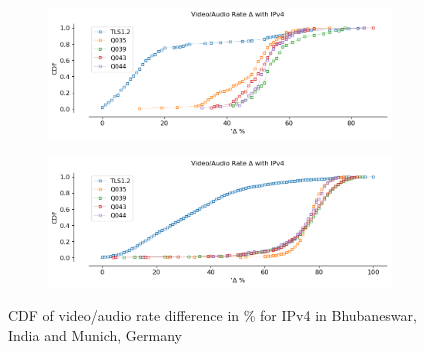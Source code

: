 \begin{frame}

\begin{figure}[!htb]
    
    \begin{subfigure}{0.45\textwidth}
        \includegraphics[width=\linewidth]{./plots/youtube/india/graph_rate_diff.png}
    \end{subfigure}
    \begin{subfigure}{0.45\textwidth}
        \includegraphics[width=\linewidth]{./plots/youtube/munich/graph_rate_diff.png}
    \end{subfigure}    
    \caption{CDF of video/audio rate difference in \% for IPv4 in Bhubaneswar, India and Munich, Germany}\label{fig:cdf-of-video-audio}
\end{figure}

%
\begin{figure}[!htb]
    

\end{figure}
\end{frame}
